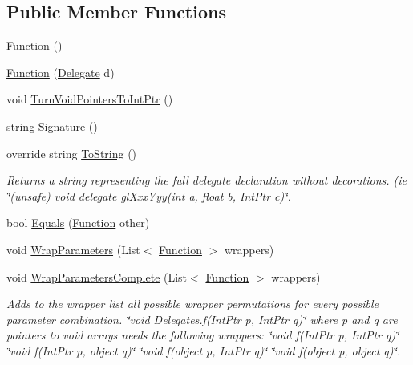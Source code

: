 \subsection*{Public Member Functions}
\begin{DoxyCompactItemize}
\item 
\hyperlink{class_bind_1_1_structures_1_1_function_aa60734a5c875616a8a7a3375b3cfc78e}{Function} ()
\item 
\hyperlink{class_bind_1_1_structures_1_1_function_af104651537a608c20aa3b4f8d347eadf}{Function} (\hyperlink{class_bind_1_1_structures_1_1_delegate}{Delegate} d)
\item 
void \hyperlink{class_bind_1_1_structures_1_1_function_ad6ad4a3a4a93c518db3d6c3412553c76}{TurnVoidPointersToIntPtr} ()
\item 
string \hyperlink{class_bind_1_1_structures_1_1_function_a789d0500fd108201bd2c4111e9fb5dbb}{Signature} ()
\item 
override string \hyperlink{class_bind_1_1_structures_1_1_function_ad9d6c8aca83f2127f01f73ed5d885fa5}{ToString} ()
\begin{DoxyCompactList}\small\item\em Returns a string representing the full delegate declaration without decorations. (ie \char`\"{}(unsafe) void delegate glXxxYyy(int a, float b, IntPtr c)\char`\"{}. \item\end{DoxyCompactList}\item 
bool \hyperlink{class_bind_1_1_structures_1_1_function_a8cbae7bd8721d709d5c0fe613f9f34ae}{Equals} (\hyperlink{class_bind_1_1_structures_1_1_function}{Function} other)
\item 
void \hyperlink{class_bind_1_1_structures_1_1_function_aa2c8ebdbf3d147e3eaad11e86ef2adc6}{WrapParameters} (List$<$ \hyperlink{class_bind_1_1_structures_1_1_function}{Function} $>$ wrappers)
\item 
void \hyperlink{class_bind_1_1_structures_1_1_function_a31e00d95a42076758a096357a7baf3fe}{WrapParametersComplete} (List$<$ \hyperlink{class_bind_1_1_structures_1_1_function}{Function} $>$ wrappers)
\begin{DoxyCompactList}\small\item\em Adds to the wrapper list all possible wrapper permutations for every possible parameter combination. \char`\"{}void Delegates.f(IntPtr p, IntPtr q)\char`\"{} where p and q are pointers to void arrays needs the following wrappers: \char`\"{}void f(IntPtr p, IntPtr q)\char`\"{} \char`\"{}void f(IntPtr p, object q)\char`\"{} \char`\"{}void f(object p, IntPtr q)\char`\"{} \char`\"{}void f(object p, object q)\char`\"{}. \item\end{DoxyCompactList}\item 

\end{DoxyCompactItemize}
